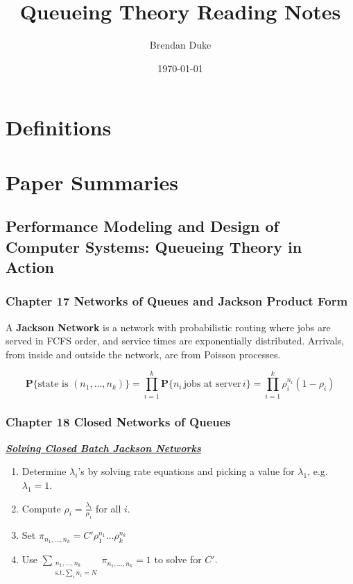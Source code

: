 \documentclass[a4paper, 12pt]{article}
\date{\today}
\title{Queueing Theory Reading Notes}
\author{Brendan Duke}
\begin{document}
\maketitle

\section{Definitions}

\section{Paper Summaries}

\subsection{Performance Modeling and Design of Computer Systems: Queueing
            Theory in Action\cite{Harchol-Balter:2013:PMD:2462638}}

\subsubsection{Chapter 17 Networks of Queues and Jackson Product Form}

A \textbf{Jackson Network} is a network with probabilistic routing where jobs
are served in FCFS order, and service times are exponentially distributed.
Arrivals, from inside and outside the network, are from Poisson processes.

\begin{equation}
        \textbf{P}\{\text{state is }(n_1,\dots,n_k)\} =
                \prod_{i = 1}^k \textbf{P} \{n_i \,\text{jobs at server}\, i\} =
                \prod_{i = 1}^k \rho_{i}^{n_i} (1 - \rho_i)
\end{equation}

\subsubsection{Chapter 18 Closed Networks of Queues}

\begin{mdframed}
\uline{\textbf{\textit{Solving Closed Batch Jackson Networks}}}
\begin{enumerate}
        \item Determine $\lambda_i$'s by solving rate equations and picking a
                value for $\lambda_1$, e.g. $\lambda_1 = 1$.
        \item Compute $\rho_i = \frac{\lambda_i}{\mu_i}$ for all $i$.
        \item Set $\pi_{n_1, \dots , n_k} = C'\rho_1^{n_1} \dots \rho_k^{n_k}$
        \item Use $\sum\limits_{
                        \substack{n_1, \dots, n_k \\ \text{s.t.} \sum_i n_i = N}}
                   \pi_{n_1, \dots , n_k} = 1$ to solve for $C'$.
\end{enumerate}
\end{mdframed}
\end{document}

